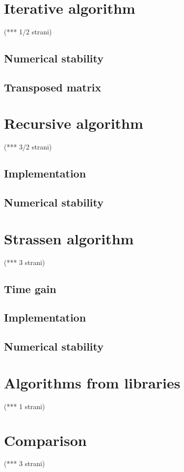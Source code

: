 \documentclass[a4paper,11pt]{article}
\begin{document}

\section{Iterative algorithm}
(*** 1/2 strani)
\subsection{Numerical stability}

\subsection{Transposed matrix}

\section{Recursive algorithm}
(*** 3/2 strani)
\subsection{Implementation}

\subsection{Numerical stability}

\section{Strassen algorithm}
(*** 3 strani)
\subsection{Time gain}

\subsection{Implementation}

\subsection{Numerical stability}

\section{Algorithms from libraries}
(*** 1 strani)
\section{Comparison}
(*** 3 strani)
\end{document}
